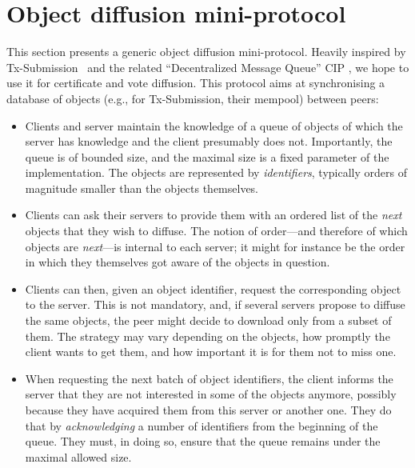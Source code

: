 \section{Object diffusion mini-protocol}%
\label{sec:object-diffusion-protocol}

This section presents a generic object diffusion mini-protocol. Heavily inspired
by Tx-Submission~\cite[Section~3.9]{network-spec-150} and the related
\enquote{Decentralized Message Queue} CIP \parencite{dmq-cip}, we hope to use it
for certificate and vote diffusion. This protocol aims at synchronising a
database of objects (e.g., for Tx-Submission, their mempool) between peers:
%
\begin{itemize}
\item
  Clients and server maintain the knowledge of a queue of objects of which the server has knowledge and the client presumably does not.
  Importantly, the queue is of bounded size, and the maximal size is a fixed parameter of the
  implementation.
  The objects are represented by {\em identifiers}, typically orders of magnitude smaller than the objects themselves.

\item
  Clients can ask their servers to provide them with an ordered list of the {\em next} objects that they wish to diffuse.
  The notion of order---and therefore of which objects are {\em next}---is internal to each server; it might for instance be the order in which they themselves got aware of the objects in question.

\item
  Clients can then, given an object identifier, request the corresponding object to the server.
  This is not mandatory, and, if several servers propose to diffuse the same objects, the peer might decide to download only from a subset of them.
  The strategy may vary depending on the objects, how promptly the client wants to get them, and how important it is for them not to miss one.

\item
  When requesting the next batch of object identifiers, the client informs the server that they are not interested in some of the objects anymore, possibly because they have acquired them from this server or another one.
  They do that by {\em acknowledging} a number of identifiers from the beginning of the queue.
  They must, in doing so, ensure that the queue remains under the maximal allowed size.
\end{itemize}

